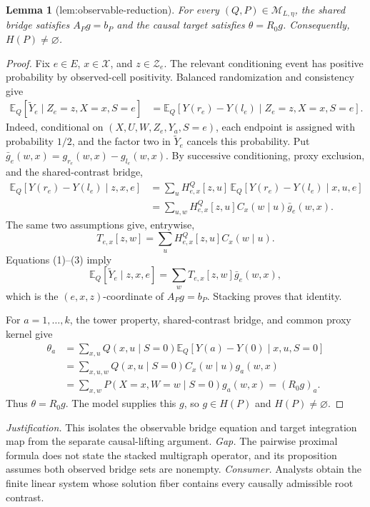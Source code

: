 \documentclass{article}
\newtheorem{lemma}{Lemma}
\begin{document}
\begin{lemma}[lem:observable-reduction]\label{lem:observable-reduction}
For every \((Q,P)\in\mathcal M_{L,\eta}\), the shared bridge satisfies \(A_Pg=b_P\) and the causal target satisfies \(\theta=R_0g\). Consequently, \(H(P)\ne\varnothing\).
\end{lemma}
\begin{proof}
Fix \(e\in E\), \(x\in\mathcal X\), and \(z\in\mathcal Z_e\).  The relevant conditioning event has positive probability by observed-cell positivity.  Balanced randomization and consistency give
\[
\begin{aligned}
\mathbb E_Q[\widetilde Y_e\mid Z_e=z,X=x,S=e]
&=\mathbb E_Q[Y(r_e)-Y(l_e)\mid Z_e=z,X=x,S=e].
\end{aligned}
\tag{1}
\]
Indeed, conditional on \((X,U,W,Z_e,Y_a,S=e)\), each endpoint is assigned with probability \(1/2\), and the factor two in \(\widetilde Y_e\) cancels this probability.  Put \(\bar g_e(w,x)=g_{r_e}(w,x)-g_{l_e}(w,x)\).  By successive conditioning, proxy exclusion, and the shared-contrast bridge,
\[
\begin{aligned}
\mathbb E_Q[Y(r_e)-Y(l_e)\mid z,x,e]
&=\sum_uH^Q_{e,x}[z,u]\,
  \mathbb E_Q[Y(r_e)-Y(l_e)\mid x,u,e]\\
&=\sum_{u,w}H^Q_{e,x}[z,u]C_x(w\mid u)\bar g_e(w,x).
\end{aligned}
\tag{2}
\]
The same two assumptions give, entrywise,
\[
T_{e,x}[z,w]=\sum_uH^Q_{e,x}[z,u]C_x(w\mid u).
\tag{3}
\]
Equations (1)--(3) imply
\[
\mathbb E_Q[\widetilde Y_e\mid z,x,e]
=\sum_wT_{e,x}[z,w]\bar g_e(w,x),
\]
which is the \((e,x,z)\)-coordinate of \(A_Pg=b_P\).  Stacking proves that identity.

For \(a=1,\ldots,k\), the tower property, shared-contrast bridge, and common proxy kernel give
\[
\begin{aligned}
\theta_a
&=\sum_{x,u}Q(x,u\mid S=0)
  \mathbb E_Q[Y(a)-Y(0)\mid x,u,S=0]\\
&=\sum_{x,u,w}Q(x,u\mid S=0)C_x(w\mid u)g_a(w,x)\\
&=\sum_{x,w}P(X=x,W=w\mid S=0)g_a(w,x)
=(R_0g)_a.
\end{aligned}
\tag{4}
\]
Thus \(\theta=R_0g\).  The model supplies this \(g\), so \(g\in H(P)\) and \(H(P)\ne\varnothing\).
\end{proof}
\par\smallskip\noindent \textit{Justification.} This isolates the observable bridge equation and target integration map from the separate causal-lifting argument. \textit{Gap.} The pairwise proximal formula does not state the stacked multigraph operator, and its proposition assumes both observed bridge sets are nonempty. \textit{Consumer.} Analysts obtain the finite linear system whose solution fiber contains every causally admissible root contrast.
\end{document}

